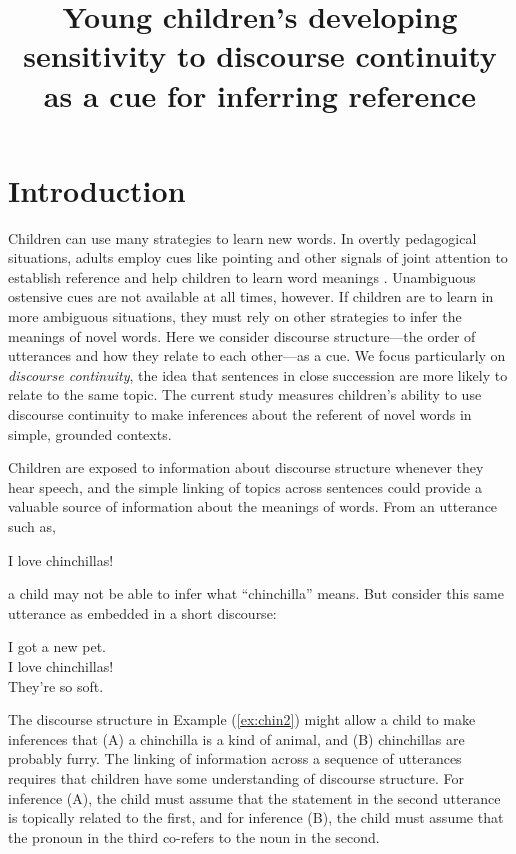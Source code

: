 \documentclass[man]{apa2}
\title{Young children's developing sensitivity to discourse continuity as a cue for inferring reference}
\begin{document}
\maketitle                            


\section{Introduction}

Children can use many strategies to learn new words.  In overtly pedagogical situations, adults employ cues like pointing and other signals of joint attention to establish reference and help children to learn word meanings \cite{bakeman1984,csibra2010,hollich2000}.  Unambiguous ostensive cues are not available at all times, however.  If children are to learn in more ambiguous situations, they must rely on other strategies to infer the meanings of novel words. Here we consider discourse structure---the order of utterances and how they relate to each other---as a cue. We focus particularly on \emph{discourse continuity}, the idea that sentences in close succession are more likely to relate to the same topic. The current study measures children's ability to use discourse continuity to make inferences about the referent of novel words in simple, grounded contexts.

Children are exposed to information about discourse structure whenever they hear speech, and the simple linking of topics across sentences could provide a valuable source of information about the meanings of words. From an utterance such as,

\begin{example}
\label{ex:chin1}
I love chinchillas!
\end{example}

\noindent a child may not be able to infer what ``chinchilla'' means. But consider this same utterance as embedded in a short discourse:

\begin{example}
\label{ex:chin2}
I got a new pet. \\ I love chinchillas! \\ They're so soft.
\end{example}

\noindent The discourse structure in Example (\ref{ex:chin2}) might allow a child to make inferences that (A) a chinchilla is a kind of animal, and (B) chinchillas are probably furry.  The linking of information across a sequence of utterances requires that children have some understanding of discourse structure.  For inference (A), the child must assume that the statement in the second utterance is topically related to the first, and for inference (B), the child must assume that the pronoun in the third co-refers to the noun in the second. 
\end{document}

